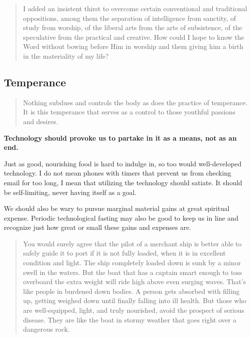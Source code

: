 \documentclass[letterpaper]{article}
\begin{document}
    \begin{quote}
      I added an insistent thirst to overcome certain conventional and traditional oppositions, among them the separation of intelligence from sanctity, of study from worship, of the liberal arts from the arts of subsistence, of the speculative from the practical and creative. How could I hope to know the Word without bowing before Him in worship and them giving him a birth in the materiality of my life?
    \end{quote}


  \subsection{Temperance}

    \begin{quote}
      Nothing subdues and controls the body as does the practice of temperance. It is this temperance that serves as a control to those youthful passions and desires.
    \end{quote}

    \textbf{Technology should provoke us to partake in it as a means, not as an end.} 

    Just as good, nourishing food is hard to indulge in, so too would well-developed technology. I do not mean phones with timers that prevent us from checking email for too long, I mean that utilizing the technology should satiate. It should be self-limiting, never having itself as a goal.

    We should also be wary to pursue marginal material gains at great spiritual expense. Periodic technological fasting may also be good to keep us in line and recognize just how great or small these gains and expenses are.

    \begin{quote}
      You would surely agree that the pilot of a merchant ship is better able to safely guide it to port if it is not fully loaded, when it is in excellent condition and light. The ship completely loaded down is sunk by a minor swell in the waters. But the boat that has a captain smart enough to toss overboard the extra weight will ride high above even surging waves.
      That’s like people in burdened down bodies. A person gets absorbed with filling up, getting weighed down until finally falling into ill health. But those who are well-equipped, light, and truly nourished, avoid the prospect of serious disease. They are like the boat in stormy weather that goes right over a dangerous rock.
    \end{quote}
\end{document}
